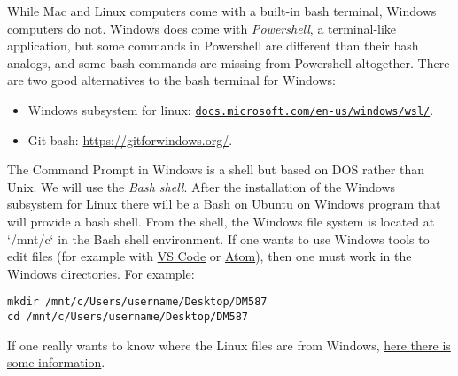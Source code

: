 %
%
%
%



\begin{info}
While Mac and Linux computers come with a built-in bash terminal, Windows computers do not.
Windows does come with \emph{Powershell}, a terminal-like application, but some commands in Powershell are different than their bash analogs, and some bash commands are missing from Powershell altogether.
There are two good alternatives to the bash terminal for Windows:
\begin{itemize}
\item Windows subsystem for linux: \href{https://docs.microsoft.com/en-us/windows/wsl/install-win10}{\texttt{docs.microsoft.com/en-us/windows/wsl/}}.
\item Git bash: \url{https://gitforwindows.org/}.
\end{itemize}
\end{info}



The Command Prompt in Windows is a shell but based on DOS rather than
Unix.  We will use the \emph{Bash shell}. After the installation of the
Windows subsystem for Linux there will be a Bash on Ubuntu on Windows
program that will provide a bash shell. From the shell, the Windows file system is located
at `/mnt/c` in the Bash shell environment. If one wants to use Windows
tools to edit files (for example with
\href{https://code.visualstudio.com/}{VS Code} or
\href{https://atom.io/}{Atom}), then one must work in the Windows
directories. For example:

\begin{lstlisting}
mkdir /mnt/c/Users/username/Desktop/DM587
cd /mnt/c/Users/username/Desktop/DM587
\end{lstlisting}

If one really wants to know where the Linux files are from Windows,
\href{https://www.howtogeek.com/261383/how-to-access-your-ubuntu-bash-files-in-windows-and-your-windows-system-drive-in-bash/}{here there is some information}.



